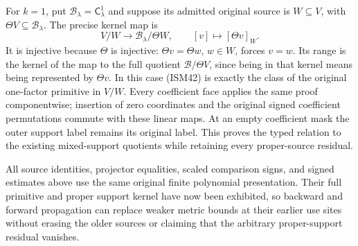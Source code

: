 For \(k=1\), put
\(\mathscr B_\lambda=\mathsf C_\lambda^1\)
and suppose its admitted original source is
\(W\subseteq V\), with \(\Theta V\subseteq
\mathscr B_\lambda\).  The precise kernel map is
\[
 V/W\longrightarrow\mathscr B_\lambda/\Theta W,
 \qquad [v]\longmapsto[\Theta v]_W.
 \tag{ISM43}
\]
It is injective because \(\Theta\) is injective:
\(\Theta v=\Theta w\), \(w\in W\), forces \(v=w\).
Its range is the kernel of the map to the full
quotient \(\mathscr B/\Theta V\), since being in
that kernel means being represented by
\(\Theta v\).  In this case (ISM42) is exactly
the class of the original one-factor primitive
in \(V/W\).  Every coefficient face applies the
same proof componentwise; insertion of zero
coordinates and the original signed coefficient
permutations commute with these linear maps.
At an empty coefficient mask the outer support
label remains its original label.  This proves
the typed relation to the existing mixed-support
quotients while retaining every proper-source
residual.

All source identities, projector equalities,
scaled comparison signs, and signed estimates
above use the same original finite polynomial
presentation.  Their full primitive and proper
support kernel have now been exhibited, so
backward and forward propagation can replace
weaker metric bounds at their earlier use sites
without erasing the older sources or claiming
that the arbitrary proper-support residual
vanishes.
